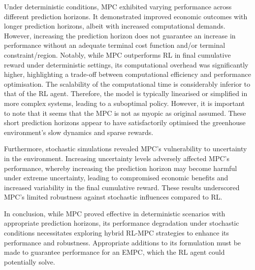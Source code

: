 Under deterministic conditions, MPC exhibited varying performance across different prediction horizons. It demonstrated improved economic outcomes with longer prediction horizons, albeit with increased computational demands. However, increasing the prediction horizon does not guarantee an increase in performance without an adequate terminal cost function and/or terminal constraint/region. Notably, while MPC outperforms RL in final cumulative reward under deterministic settings, its computational overhead was significantly higher, highlighting a trade-off between computational efficiency and performance optimisation. The scalability of the computational time is considerably inferior to that of the RL agent. Therefore, the model is typically linearised or simplified in more complex systems, leading to a suboptimal policy. However, it is important to note that it seems that the MPC is not as myopic as original assumed. These short prediction horizons appear to have satisfactorily optimised the greenhouse environment's slow dynamics and sparse rewards. 

Furthermore, stochastic simulations revealed MPC’s vulnerability to uncertainty in the environment. Increasing uncertainty levels adversely affected MPC’s performance, whereby increasing the prediction horizon may become harmful under extreme uncertainty, leading to compromised economic benefits and increased variability in the final cumulative reward. These results underscored MPC’s limited robustness against stochastic influences compared to RL.

In conclusion, while MPC proved effective in deterministic scenarios with appropriate prediction horizons, its performance degradation under stochastic conditions necessitates exploring hybrid RL-MPC strategies to enhance its performance and robustness. Appropriate additions to its formulation must be made to guarantee performance for an EMPC, which the RL agent could potentially solve.

